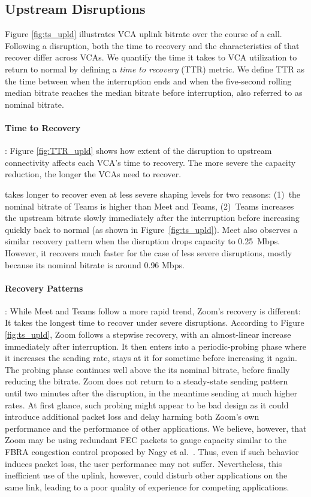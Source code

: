 \subsection{Upstream Disruptions}

Figure \ref{fig:ts_upld} illustrates VCA uplink bitrate over the course of a
call. Following a disruption, both the time to recovery and the
characteristics of that recover
differ across VCAs. We quantify the time it takes to
VCA utilization to return to normal by defining a 
\textit{time to recovery} (TTR) metric. We define TTR as the time between when the
interruption ends and when the five-second rolling median bitrate reaches the
median bitrate before interruption, also referred to as nominal bitrate. 

\paragraph{Time to Recovery}: Figure \ref{fig:TTR_upld} shows how extent of
the disruption to upstream connectivity affects each VCA's time to recovery.
The more severe the capacity reduction, the longer the VCAs need to recover.

\teams takes longer to recover even at less severe shaping levels for two
reasons: (1)~the nominal bitrate of Teams is higher than Meet and Teams,
(2)~Teams increases the upstream bitrate slowly immediately after the
interruption before increasing quickly back to normal (as shown in
Figure~\ref{fig:ts_upld}). Meet also observes a similar recovery pattern when
the disruption drops capacity to 0.25~Mbps. However, it recovers much faster
for the case of less severe disruptions, mostly because its nominal bitrate is
around 0.96 Mbps. 

\paragraph{Recovery Patterns}: While Meet and Teams follow a more rapid trend,
Zoom's recovery is different: It takes the longest time to recover under
severe disruptions. According to Figure \ref{fig:ts_upld}, Zoom follows a
stepwise recovery, with an almost-linear increase immediately after
interruption. It then enters into a periodic-probing phase where it increases
the sending rate, stays at it for sometime before increasing it again. The
probing phase continues well above the its nominal bitrate, before finally
reducing the bitrate.  Zoom does not return to a steady-state sending pattern
until two minutes after the disruption, in the meantime sending at much higher
rates. At first glance, such probing might appear to be bad design as it could
introduce additional packet loss and delay harming both Zoom's own performance
and the performance of other applications.  We believe, however, that Zoom may
be using redundant FEC packets to gauge capacity similar to the
FBRA congestion control proposed by Nagy et al.~\cite{nagy2014congestion}.
Thus, even if such behavior induces packet loss, the user performance may not
suffer. Nevertheless, this inefficient use of the uplink, however, could
disturb other applications on the same link, leading to a poor quality of
experience for competing applications. 

